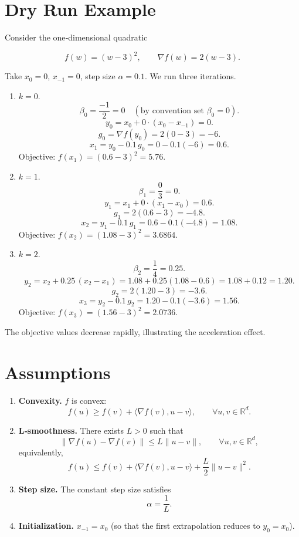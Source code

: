 \documentclass{article}
\newcommand{\R}{\mathbb{R}}
\begin{document}
\section*{Dry Run Example}
Consider the one‑dimensional quadratic  

\[
f(w)=(w-3)^2,\qquad \nabla f(w)=2(w-3).
\]

Take $x_0=0$, $x_{-1}=0$, step size $\alpha=0.1$.
We run three iterations.

\begin{enumerate}[label=\textbf{Iter \arabic*:}, leftmargin=*]
\item $k=0$.
\[
\beta_0=\frac{-1}{2}=0\quad(\text{by convention set }\beta_0=0).
\]
\[
y_0 = x_0 + 0\cdot(x_0-x_{-1}) = 0.
\]
\[
g_0 = \nabla f(y_0)=2(0-3)=-6.
\]
\[
x_1 = y_0 - 0.1\,g_0 = 0 -0.1(-6)=0.6.
\]
Objective: $f(x_1)=(0.6-3)^2=5.76$.

\item $k=1$.
\[
\beta_1=\frac{0}{3}=0.
\]
\[
y_1 = x_1 + 0\cdot(x_1-x_0)=0.6.
\]
\[
g_1 = 2(0.6-3) = -4.8.
\]
\[
x_2 = y_1 -0.1\,g_1 = 0.6-0.1(-4.8)=1.08.
\]
Objective: $f(x_2)=(1.08-3)^2=3.6864$.

\item $k=2$.
\[
\beta_2=\frac{1}{4}=0.25.
\]
\[
y_2 = x_2 + 0.25\,(x_2-x_1)=1.08+0.25(1.08-0.6)=1.08+0.12=1.20.
\]
\[
g_2 = 2(1.20-3) = -3.6.
\]
\[
x_3 = y_2 -0.1\,g_2 = 1.20-0.1(-3.6)=1.56.
\]
Objective: $f(x_3)=(1.56-3)^2=2.0736$.
\end{enumerate}

The objective values decrease rapidly, illustrating the acceleration effect.

\newpage
\section*{Assumptions}
\begin{enumerate}[label=\textbf{A\arabic*:}, leftmargin=*]
\item \textbf{Convexity.} $f$ is convex:
\[
f(u)\ge f(v)+\langle\nabla f(v),u-v\rangle,\qquad\forall u,v\in\R^d.
\]

\item \textbf{L‑smoothness.} There exists $L>0$ such that
\[
\|\nabla f(u)-\nabla f(v)\|\le L\|u-v\|,\qquad\forall u,v\in\R^d,
\]
equivalently,
\[
f(u)\le f(v)+\langle\nabla f(v),u-v\rangle+\frac{L}{2}\|u-v\|^{2}.
\tag{3}
\]

\item \textbf{Step size.} The constant step size satisfies
\[
\alpha = \frac{1}{L}.
\]

\item \textbf{Initialization.} $x_{-1}=x_0$ (so that the first extrapolation reduces to $y_0=x_0$).

\end{enumerate}
\end{document}
